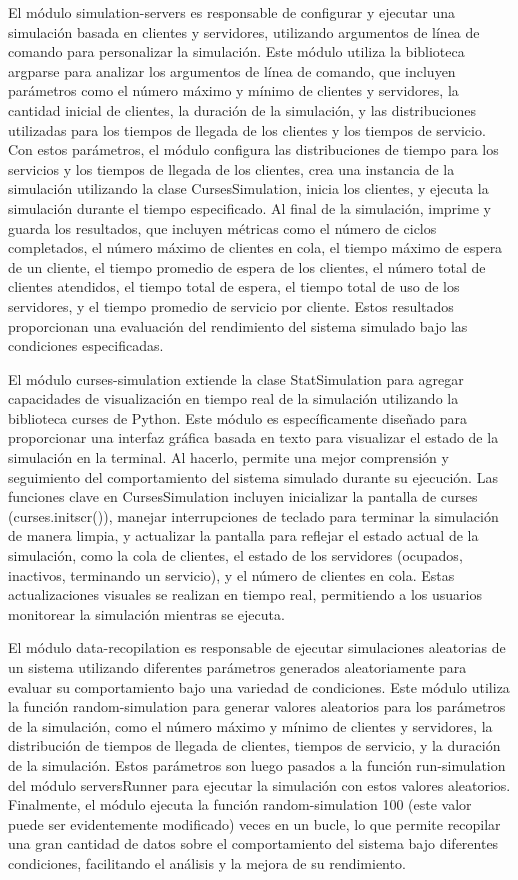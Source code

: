 \documentclass[12pt]{article}
\begin{document}
El módulo simulation-servers es responsable de configurar y ejecutar una simulación basada en clientes y servidores, utilizando argumentos de línea de comando para personalizar la simulación. Este módulo utiliza la biblioteca argparse para analizar los argumentos de línea de comando, que incluyen parámetros como el número máximo y mínimo de clientes y servidores, la cantidad inicial de clientes, la duración de la simulación, y las distribuciones utilizadas para los tiempos de llegada de los clientes y los tiempos de servicio. Con estos parámetros, el módulo configura las distribuciones de tiempo para los servicios y los tiempos de llegada de los clientes, crea una instancia de la simulación utilizando la clase CursesSimulation, inicia los clientes, y ejecuta la simulación durante el tiempo especificado. Al final de la simulación, imprime y guarda los resultados, que incluyen métricas como el número de ciclos completados, el número máximo de clientes en cola, el tiempo máximo de espera de un cliente, el tiempo promedio de espera de los clientes, el número total de clientes atendidos, el tiempo total de espera, el tiempo total de uso de los servidores, y el tiempo promedio de servicio por cliente. Estos resultados proporcionan una evaluación del rendimiento del sistema simulado bajo las condiciones especificadas.

El módulo curses-simulation extiende la clase StatSimulation para agregar capacidades de visualización en tiempo real de la simulación utilizando la biblioteca curses de Python. Este módulo es específicamente diseñado para proporcionar una interfaz gráfica basada en texto para visualizar el estado de la simulación en la terminal. Al hacerlo, permite una mejor comprensión y seguimiento del comportamiento del sistema simulado durante su ejecución. Las funciones clave en CursesSimulation incluyen inicializar la pantalla de curses (curses.initscr()), manejar interrupciones de teclado para terminar la simulación de manera limpia, y actualizar la pantalla para reflejar el estado actual de la simulación, como la cola de clientes, el estado de los servidores (ocupados, inactivos, terminando un servicio), y el número de clientes en cola. Estas actualizaciones visuales se realizan en tiempo real, permitiendo a los usuarios monitorear la simulación mientras se ejecuta.

El módulo data-recopilation es responsable de ejecutar simulaciones aleatorias de un sistema utilizando diferentes parámetros generados aleatoriamente para evaluar su comportamiento bajo una variedad de condiciones. Este módulo utiliza la función random-simulation para generar valores aleatorios para los parámetros de la simulación, como el número máximo y mínimo de clientes y servidores, la distribución de tiempos de llegada de clientes, tiempos de servicio, y la duración de la simulación. Estos parámetros son luego pasados a la función run-simulation del módulo serversRunner para ejecutar la simulación con estos valores aleatorios. Finalmente, el módulo ejecuta la función random-simulation 100 (este valor puede ser evidentemente modificado) veces en un bucle, lo que permite recopilar una gran cantidad de datos sobre el comportamiento del sistema bajo diferentes condiciones, facilitando el análisis y la mejora de su rendimiento.
\end{document}
